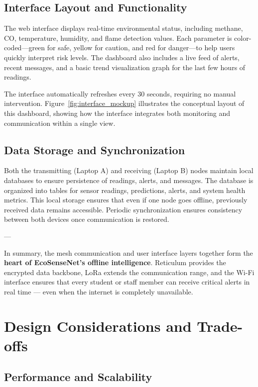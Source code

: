 \subsection{Interface Layout and Functionality}

The web interface displays real-time environmental status, including methane, CO, temperature, humidity, and flame detection values. Each parameter is color-coded—green for safe, yellow for caution, and red for danger—to help users quickly interpret risk levels. The dashboard also includes a live feed of alerts, recent messages, and a basic trend visualization graph for the last few hours of readings.

The interface automatically refreshes every 30 seconds, requiring no manual intervention. Figure~\ref{fig:interface_mockup} illustrates the conceptual layout of this dashboard, showing how the interface integrates both monitoring and communication within a single view.

\subsection{Data Storage and Synchronization}

Both the transmitting (Laptop A) and receiving (Laptop B) nodes maintain local databases to ensure persistence of readings, alerts, and messages. The database is organized into tables for sensor readings, predictions, alerts, and system health metrics. This local storage ensures that even if one node goes offline, previously received data remains accessible. Periodic synchronization ensures consistency between both devices once communication is restored.

---

\noindent In summary, the mesh communication and user interface layers together form the \textbf{heart of EcoSenseNet’s offline intelligence}. Reticulum provides the encrypted data backbone, LoRa extends the communication range, and the Wi-Fi interface ensures that every student or staff member can receive critical alerts in real time — even when the internet is completely unavailable.
\section{Design Considerations and Trade-offs}

\subsection{Performance and Scalability}


